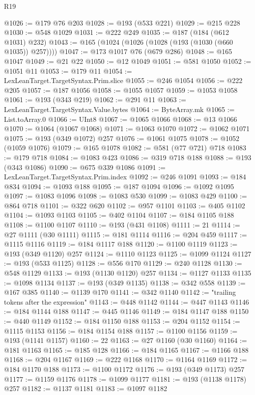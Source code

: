 \begin{lexlean}{R19}
\begin{coremodule}
@1026 := @179 @76 @203
@1028 := @193 (@533 @221)
@1029 := @215 @228
@1030 := @548 @1029
@1031 := @222 @249
@1035 := @187 (@184 (@612 @1031) @232)
@1043 := @165 (@1024 (@1026 (@1028 (@193 (@1030 (@660 @1035)) @257))))
@1047 := @173 @1017 @76 (@679 @286)
@1048 := @165 @1047
@1049 := @21 @22
@1050 := @12 @1049
@1051 := @581 @1050
@1052 := @1051 @11
@1053 := @179 @11
@1054 := LexLeanTarget.TargetSyntax.Prim.slice
@1055 := @246 @1054
@1056 := @222 @205
@1057 := @187 @1056
@1058 := @1055 @1057
@1059 := @1053 @1058
@1061 := @193 (@343 @219)
@1062 := @291 @11
@1063 := LexLeanTarget.TargetSyntax.Value.bytes
@1064 := ByteArray.mk
@1065 := List.toArray.{0}
@1066 := UInt8
@1067 := @1065 @1066
@1068 := @13 @1066
@1070 := @1064 (@1067 @1068)
@1071 := @1063 @1070
@1072 := @1062 @1071
@1075 := @193 (@349 @1072) @257
@1076 := @1061 @1075
@1078 := @1052 (@1059 @1076)
@1079 := @165 @1078
@1082 := @581 (@77 @721) @718
@1083 := @179 @718
@1084 := @1083 @423
@1086 := @319 @718 @188
@1088 := @193 (@343 @1086)
@1090 := @675 @339 @1086
@1091 := LexLeanTarget.TargetSyntax.Prim.index
@1092 := @246 @1091
@1093 := @184 @834
@1094 := @1093 @188
@1095 := @187 @1094
@1096 := @1092 @1095
@1097 := @1083 @1096
@1098 := @1083 @530
@1099 := @1083 @429
@1100 := @864 @718
@1101 := @322 @620
@1102 := @957 @1101
@1103 := @405 @1102
@1104 := @1093 @1103
@1105 := @402 @1104
@1107 := @184 @1105 @188
@1108 := @1100 @1107
@1110 := @193 (@431 @1108)
@1111 := 21
@1114 := @27 @1111 (@30 @1111)
@1115 := @181 @1114
@1116 := @204 @459
@1117 := @1115 @1116
@1119 := @184 @1117 @188
@1120 := @1100 @1119
@1123 := @193 (@349 @1120) @257
@1124 := @1110 @1123
@1125 := @1099 @1124
@1127 := @193 (@533 @1125)
@1128 := @556 @170
@1129 := @240 @1128
@1130 := @548 @1129
@1133 := @193 (@1130 @1120) @257
@1134 := @1127 @1133
@1135 := @1098 @1134
@1137 := @193 (@349 @1135)
@1138 := @342 @558
@1139 := @167 @385
@1140 := @1139 @170
@1141 := @342 @1140
@1142 := "trailing tokens after the expression"
@1143 := @448 @1142
@1144 := @447 @1143
@1146 := @184 @1144 @188
@1147 := @445 @1146
@1149 := @184 @1147 @188
@1150 := @440 @1149
@1152 := @184 @1150 @188
@1153 := @204 @1152
@1154 := @1115 @1153
@1156 := @184 @1154 @188
@1157 := @1100 @1156
@1159 := @193 (@1141 @1157)
@1160 := 22
@1163 := @27 @1160 (@30 @1160)
@1164 := @181 @1163
@1165 := @185 @128
@1166 := @184 @1165
@1167 := @1166 @188
@1168 := @204 @1167
@1169 := @222 @1168
@1170 := @1164 @1169
@1172 := @184 @1170 @188
@1173 := @1100 @1172
@1176 := @193 (@349 @1173) @257
@1177 := @1159 @1176
@1178 := @1099 @1177
@1181 := @193 (@1138 @1178) @257
@1182 := @1137 @1181
@1183 := @1097 @1182

\end{coremodule}
\end{lexlean}
